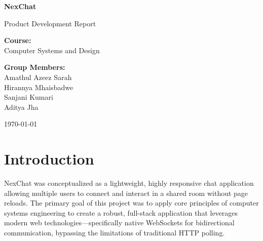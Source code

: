 \documentclass[12pt, a4paper]{article}
\begin{document}
\begin{titlepage}
    \centering
    \vspace*{2cm}
    
    \Huge
    \textbf{NexChat}
    
    \vspace{0.5cm}
    \LARGE
    Product Development Report
    
    \vspace{1.5cm}
    
    \textbf{Course:} \\
    Computer Systems and Design
    
    \vspace{2cm}
    
    \textbf{Group Members:} \\
    \Large
    Amathul Azeez Sarah \\
    Hirannya Mhaisbadwe \\
    Sanjani Kumari \\
    Aditya Jha
    
    \vfill
    
    \large
    \today
    
\end{titlepage}

\begin{abstract}
This report details the end-to-end development, architecture, and design of \textbf{NexChat}, a modern, real-time group messaging application. Built using a React frontend, a FastAPI Python backend, and native WebSockets, the application provides a seamless, low-latency chatting experience. This report discusses the product overview, UI/UX design, technology stack, and the decoupled client-server architecture developed for the Computer Systems and Design course.
\end{abstract}

\tableofcontents
\newpage

\section{Introduction}
NexChat was conceptualized as a lightweight, highly responsive chat application allowing multiple users to connect and interact in a shared room without page reloads. The primary goal of this project was to apply core principles of computer systems engineering to create a robust, full-stack application that leverages modern web technologies—specifically native WebSockets for bidirectional communication, bypassing the limitations of traditional HTTP polling.
\end{document}

